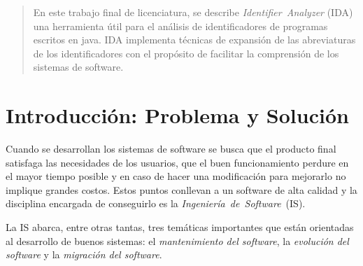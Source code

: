 \documentclass[a4paper,12pt]{report}
\begin{document}
\begin{abstract}
En este trabajo final de licenciatura, se describe \mbox{\textit{Identifier Analyzer}} (IDA) una herramienta útil para el análisis de identificadores de programas escritos en java. IDA implementa técnicas de expansión de las abreviaturas de los identificadores con el propósito de facilitar la comprensión de los sistemas de software. 


\end{abstract}

%

\tableofcontents %


\chapter{Introducción: Problema y Solución}

Cuando se desarrollan los sistemas de software se busca que el producto final satisfaga las necesidades de los usuarios, que el buen funcionamiento perdure en el mayor tiempo posible y en caso de hacer una modificación para mejorarlo no implique grandes costos. Estos puntos conllevan a un software de alta calidad y la disciplina encargada de conseguirlo es la \mbox{\textit{Ingeniería de Software} (IS).}

La IS abarca, entre otras tantas, tres temáticas importantes que están orientadas al desarrollo de buenos sistemas: el \textit{mantenimiento del software}, la \textit{evolución del software} y la \textit{migración del software}. 
\end{document}
